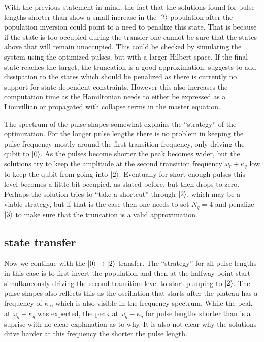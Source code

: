 \documentclass[main.tex]{subfiles}
\begin{document}
With the previous statement in mind, the fact that the solutions found for pulse lengths shorter than  show a small increase in the \(\ket{2}\) population after the population inversion could point to a need to penalize this state.
That is because if the state is too occupied during the transfer one cannot be sure that the states above that will remain unoccupied.
This could be checked by simulating the system using the optimized pulses, but with a larger Hilbert space.
If the final state reaches the target, the truncation is a good approximation.
\krotov{} suggests to add dissipation to the states which should be penalized as there is currently no support for state-dependent constraints.
However this also increases the computation time as the Hamiltonian needs to either be expressed as a Liouvillian or propagated with collapse terms in the master equation.

The spectrum of the pulse shapes somewhat explains the ``strategy'' of the optimization.
For the longer pulse lengths there is no problem in keeping the pulse frequency mostly around the first transition frequency, only driving the qubit to \(\ket{0}\).
As the pulses become shorter the peak becomes wider, but the solutions try to keep the amplitude at the second transition frequency \(\omega_r+\kappa_q\) low to keep the qubit from going into \(\ket{2}\).
Eventually for short enough pulses this level becomes a little bit occupied, as stated before, but then drops to zero.
Perhaps the solution tries to ``take a shortcut'' through \(\ket{2}\), which may be a viable strategy, but if that is the case then one needs to set \(N_q = 4\) and penalize \(\ket{3}\) to make sure that the truncation is a valid approximation.

\subsection{%
	\texorpdfstring{}{0 -> 2} state transfer
}
Now we continue with the \(\ket{0}\rightarrow\ket{2}\) transfer.
The ``strategy'' for all pulse lengths in this case is to first invert the population and then at the halfway point start simultaneously driving the second transition level to start pumping to \(\ket{2}\).
The pulse shapes also reflects this as the oscillation that starts after the plateau has a frequency of \(\kappa_q\), which is also visible in the frequency spectrum.
While the peak at \(\omega_q+\kappa_q\) was expected, the peak at \(\omega_q-\kappa_q\) for pulse lengths shorter than  is a suprise with no clear explanation as to why.
It is also not clear why the solutions drive harder at this frequency the shorter the pulse length.
\end{document}

